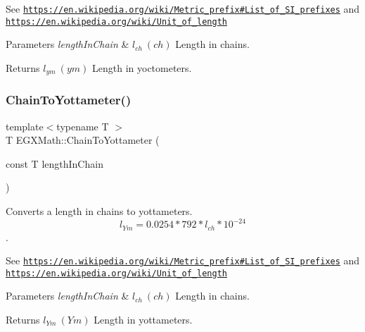 See \href{https://en.wikipedia.org/wiki/Metric_prefix#List_of_SI_prefixes}{\tt https\+://en.\+wikipedia.\+org/wiki/\+Metric\+\_\+prefix\#\+List\+\_\+of\+\_\+\+S\+I\+\_\+prefixes} and \href{https://en.wikipedia.org/wiki/Unit_of_length}{\tt https\+://en.\+wikipedia.\+org/wiki/\+Unit\+\_\+of\+\_\+length} 
\begin{DoxyParams}{Parameters}
{\em length\+In\+Chain} & $ l_{ch}\ (ch)$ Length in chains. \\
\hline
\end{DoxyParams}
\begin{DoxyReturn}{Returns}
$ l_{ym}\ (ym)$ Length in yoctometers. 
\end{DoxyReturn}
\mbox{\label{group___e_g_x_math-_conversions-_length_conversions-_surveyors-_chain-_s_i_ga033ed288c43416b74a897a3902cc49b2}} 
\subsubsection{\texorpdfstring{Chain\+To\+Yottameter()}{ChainToYottameter()}}
{\footnotesize\ttfamily template$<$typename T $>$ \\
T E\+G\+X\+Math\+::\+Chain\+To\+Yottameter (\begin{DoxyParamCaption}\item[{const T}]{length\+In\+Chain }\end{DoxyParamCaption})}



Converts a length in chains to yottameters. \[ l_{Ym}=0.0254 * 792 * l_{ch} * 10^{-24} \]. 

See \href{https://en.wikipedia.org/wiki/Metric_prefix#List_of_SI_prefixes}{\tt https\+://en.\+wikipedia.\+org/wiki/\+Metric\+\_\+prefix\#\+List\+\_\+of\+\_\+\+S\+I\+\_\+prefixes} and \href{https://en.wikipedia.org/wiki/Unit_of_length}{\tt https\+://en.\+wikipedia.\+org/wiki/\+Unit\+\_\+of\+\_\+length} 
\begin{DoxyParams}{Parameters}
{\em length\+In\+Chain} & $ l_{ch}\ (ch)$ Length in chains. \\
\hline
\end{DoxyParams}
\begin{DoxyReturn}{Returns}
$ l_{Ym}\ (Ym)$ Length in yottameters. 
\end{DoxyReturn}
\mbox{\label{group___e_g_x_math-_conversions-_length_conversions-_surveyors-_chain-_s_i_ga5c9f25b27d059b6b458111270a20209a}} 
